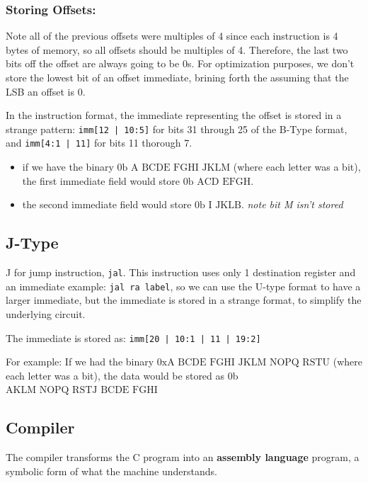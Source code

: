\documentclass[12pt]{article}
\begin{document}
\subsubsection*{Storing Offsets:}
Note all of the previous offsets were multiples of 4 since each instruction is 4 bytes of memory, so all offsets should be multiples of 4. Therefore, the last two bits off the offset are always going to be 0s. For optimization purposes, we don't store the lowest bit of an offset immediate, brining forth the assuming that the LSB an offset is 0.

In the instruction format, the immediate representing the offset is stored in a strange pattern:
\lstinline{imm[12 | 10:5]}  for bits 31 through 25 of the B-Type format, and \lstinline{imm[4:1 | 11]} for bits 11 thorough 7.
\begin{itemize}
    \item if we have the binary $\text{0b A BCDE FGHI JKLM}$ (where each letter was a bit), the first immediate field would store $\text{0b ACD EFGH}$.
    \item the second immediate field would store $\text{0b I JKLB}$. \emph{note bit M isn't stored}
\end{itemize}



\subsection*{J-Type}
J for jump instruction, \lstinline{jal}. This instruction uses only 1 destination register and an immediate example: \lstinline{jal ra label}, so we can use the U-type format to have a larger immediate, but the immediate is stored in a strange format, to simplify the underlying circuit.

The immediate is stored as: \lstinline{imm[20 | 10:1 | 11 | 19:2]}

For example: If we had the binary $\text{0xA BCDE FGHI JKLM NOPQ RSTU}$ (where each letter was a bit), the data would be stored as 0b $\text{AKLM NOPQ RSTJ BCDE FGHI}$



\subsection*{Compiler}
The compiler transforms the C program into an \textbf{assembly language} program, a symbolic form of what the machine understands.
\end{document}
